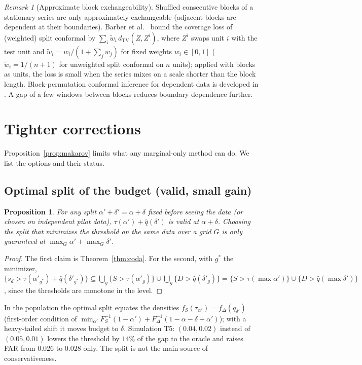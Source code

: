 \documentclass[conference]{IEEEtran}
\newtheorem{proposition}{Proposition}
\theoremstyle{definition}
\theoremstyle{remark}
\newtheorem{remark}{Remark}
\begin{document}
\begin{remark}[Approximate block exchangeability]
Shuffled consecutive blocks of a stationary series are only approximately exchangeable (adjacent blocks are dependent at their boundaries). Barber et al.~\cite{barber2023} bound the coverage loss of (weighted) split conformal by $\sum_{i}\tilde w_i\, d_{\mathrm{TV}}(Z,Z^{i})$, where $Z^{i}$ swaps unit $i$ with the test unit and $\tilde w_i=w_i/(1+\sum_j w_j)$ for fixed weights $w_i\in[0,1]$ ($\tilde w_i=1/(n+1)$ for unweighted split conformal on $n$ units); applied with blocks as units, the loss is small when the series mixes on a scale shorter than the block length. Block-permutation conformal inference for dependent data is developed in \cite{chernozhukov2018}. A gap of a few windows between blocks reduces boundary dependence further.
\end{remark}

\section{Tighter corrections}\label{sec:tight}
Proposition~\ref{prop:makarov} limits what any marginal-only method can do. We list the options and their status.

\subsection{Optimal split of the budget (valid, small gain)}
\begin{proposition}\label{prop:split}
For any split $\alpha'+\delta'=\alpha+\delta$ fixed before seeing the data (or chosen on independent pilot data), $\tau(\alpha')+\hat q(\delta')$ is valid at $\alpha+\delta$. Choosing the split that minimizes the threshold on the \emph{same} data over a grid $G$ is only guaranteed at $\max_G\alpha'+\max_G\delta'$.
\end{proposition}
\begin{proof}
The first claim is Theorem~\ref{thm:coda}. For the second, with $g^*$ the minimizer, $\{s_d>\tau(\alpha'_{g^*})+\hat q(\delta'_{g^*})\}\subseteq\bigcup_g\{S>\tau(\alpha'_g)\}\cup\bigcup_g\{D>\hat q(\delta'_g)\}=\{S>\tau(\max\alpha')\}\cup\{D>\hat q(\max\delta')\}$, since the thresholds are monotone in the level.
\end{proof}
In the population the optimal split equates the densities $f_S(\tau_{\alpha'})=f_\Delta(q_{\delta'})$ (first-order condition of $\min_{\alpha'}F_S^{-1}(1-\alpha')+F_\Delta^{-1}(1-\alpha-\delta+\alpha')$); with a heavy-tailed shift it moves budget to $\delta$. Simulation T5: $(0.04,0.02)$ instead of $(0.05,0.01)$ lowers the threshold by $14\%$ of the gap to the oracle and raises FAR from $0.026$ to $0.028$ only. The split is not the main source of conservativeness.
\end{document}
